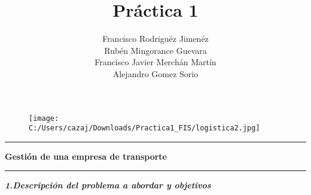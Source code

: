 \documentclass[a4paper, 12pt]{article}
\title{\textbf{Práctica 1}}
\author{
Francisco Rodriguéz Jimenéz\\
Rubén Mingorance Guevara\\
Francisco Javier Merchán Martín\\
Alejandro Gomez Sorio\\
}
\date{}
\begin{document}
\maketitle

\begin{figure}
	\centering
		\texttt{[image: C:/Users/cazaj/Downloads/Practica1\_FIS/logistica2.jpg]}
	\label{fig:logistica2}
\end{figure}

\rule{15cm}{0.1mm}

\textbf{\normalsize{Gestión de una empresa de transporte}}

\rule{15cm}{0.1mm}
\textbf{\large\emph{1.Descripción del problema a abordar y objetivos}}
\end{document}

